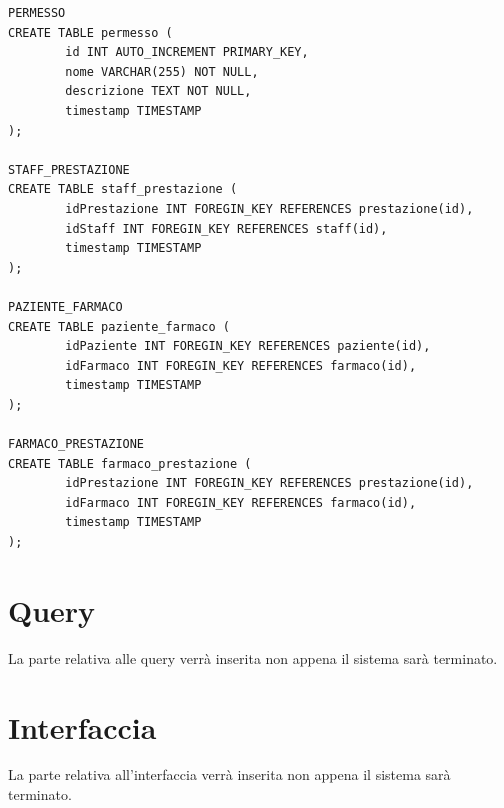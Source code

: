 \documentclass[paper=a4, fontsize=11pt,x11names]{report}
\begin{document}
\begin{verbatim}
PERMESSO
CREATE TABLE permesso (
        id INT AUTO_INCREMENT PRIMARY_KEY,
        nome VARCHAR(255) NOT NULL,
        descrizione TEXT NOT NULL,
        timestamp TIMESTAMP
);

STAFF_PRESTAZIONE
CREATE TABLE staff_prestazione (
        idPrestazione INT FOREGIN_KEY REFERENCES prestazione(id),
        idStaff INT FOREGIN_KEY REFERENCES staff(id),
        timestamp TIMESTAMP
);

PAZIENTE_FARMACO
CREATE TABLE paziente_farmaco (
        idPaziente INT FOREGIN_KEY REFERENCES paziente(id),
        idFarmaco INT FOREGIN_KEY REFERENCES farmaco(id),
        timestamp TIMESTAMP
);

FARMACO_PRESTAZIONE
CREATE TABLE farmaco_prestazione (
        idPrestazione INT FOREGIN_KEY REFERENCES prestazione(id),
        idFarmaco INT FOREGIN_KEY REFERENCES farmaco(id),
        timestamp TIMESTAMP
);

\end{verbatim}

\chapter{Query}
La parte relativa alle query verrà inserita non appena il sistema sarà terminato.

\chapter{Interfaccia}
La parte relativa all'interfaccia verrà inserita non appena il sistema sarà terminato.



\end{document}
